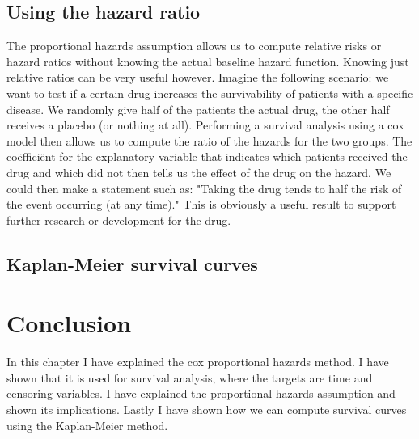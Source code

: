 \subsection{Using the hazard ratio}
The proportional hazards assumption allows us to compute relative risks or hazard ratios without knowing the actual baseline hazard function. Knowing just relative ratios can be very useful however. Imagine the following scenario: we want to test if a certain drug increases the survivability of patients with a specific disease. We randomly give half of the patients the actual drug, the other half receives a placebo (or nothing at all). Performing a survival analysis using a cox model then allows us to compute the ratio of the hazards for the two groups. The co\"effici\"ent for the explanatory variable that indicates which patients received the drug and which did not then tells us the effect of the drug on the hazard. We could then make a statement such as: "Taking the drug tends to half the risk of the event occurring (at any time)." This is obviously a useful result to support further research or development for the drug.

\subsection{Kaplan-Meier survival curves}


\section{Conclusion}
\label{sec:cox-conclusion}
In this chapter I have explained the cox proportional hazards method. I have shown that it is used for survival analysis, where the targets are time and censoring variables. I have explained the proportional hazards assumption and shown its implications. Lastly I have shown how we can compute survival curves using the Kaplan-Meier method.

